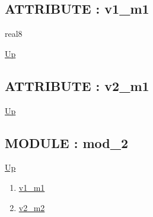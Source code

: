 \subsection*{ATTRIBUTE : v1\_m1}
\hypertarget{ecldoc:intest.in1intest.example_2.mod_1.v1_m1}{}
\par
\begin{minipage}[t]{\textwidth}
\begin{flushleft}
real8  
\end{flushleft}
\end{minipage}
\hyperlink{ecldoc:intest.in1intest.example_2.mod_1}{Up} \\
\par
\par
\subsection*{ATTRIBUTE : v2\_m1}
\hypertarget{ecldoc:intest.in1intest.example_2.mod_1.v2_m1}{}
\par
\begin{minipage}[t]{\textwidth}
\begin{flushleft}
  
\end{flushleft}
\end{minipage}
\hyperlink{ecldoc:intest.in1intest.example_2.mod_1}{Up} \\
\par
\par

\subsection*{MODULE : mod\_2}
\hypertarget{ecldoc:intest.in1intest.example_2.mod_2}{}
\par
\begin{minipage}[t]{\textwidth}
\begin{flushleft}
  
\end{flushleft}
\end{minipage}
\hyperlink{ecldoc:intest.in1intest.example_2}{Up} \\
\par
\par
\begin{enumerate}
\item \hyperlink{ecldoc:intest.in1intest.example_2.mod_2.v1_m1}{v1\_m1}
\item \hyperlink{ecldoc:intest.in1intest.example_2.mod_2.v2_m2}{v2\_m2}
\end{enumerate}
